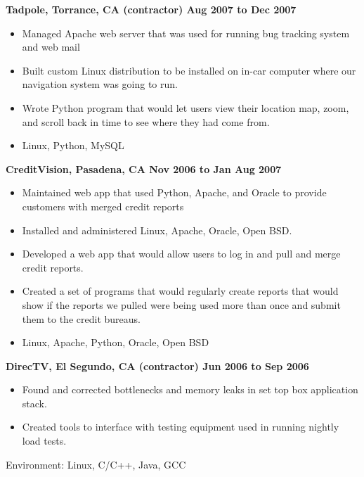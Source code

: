 \documentclass{res}
\begin{document}
\begin{resume}
{\large \bf Tadpole, Torrance, CA (contractor) \hfill Aug 2007 to Dec 2007}
\begin{itemize}

\item Managed Apache web server that was used for running bug
tracking system and web mail

\item Built custom Linux distribution to be installed on in-car
computer where our navigation system was going to run.

\item Wrote Python program that would let users view their location
map, zoom, and scroll back in time to see where they had come from.

\item Linux, Python, MySQL


\end{itemize}

{\large \bf CreditVision, Pasadena, CA \hfill Nov 2006 to Jan Aug 2007}
\begin{itemize}
\item Maintained web app that used Python, Apache, and Oracle to
provide customers with merged credit reports
\item Installed and administered Linux, Apache, Oracle, Open BSD.
\item Developed a web app that would allow users to log in and
pull and merge credit reports.
\item Created a set of programs that would regularly create reports
that would show if the reports we pulled were being used more than
once and submit them to the credit bureaus.
\item  Linux, Apache, Python, Oracle, Open BSD
\end{itemize}

{\large \bf DirecTV, El Segundo, CA (contractor) \hfill Jun 2006 to Sep 2006}

\begin{itemize}

\item Found and corrected bottlenecks and memory leaks in set top
box application stack.

\item Created tools to interface with testing equipment used in
running nightly load tests.

\end{itemize}

Environment:  Linux, C/C++, Java, GCC


\end{resume}
\end{document}
